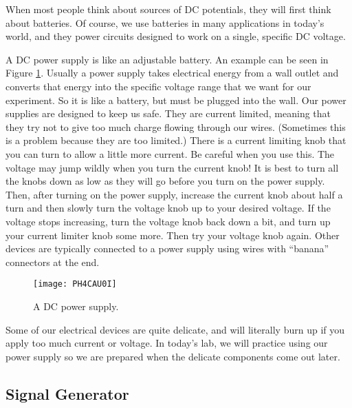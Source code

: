 When most people think about sources of DC potentials, they will first 
think about batteries. Of course, we use batteries in many applications in
today's world, and they power circuits designed to work on a single, specific
DC voltage. 

A DC power supply is like an adjustable battery.
An example can be seen in Figure \ref{fig:dc_power_supply}.
Usually a power supply takes
electrical energy from a wall outlet and converts that energy into the
specific voltage range that we want for our experiment. So it is like a
battery, but must be plugged into the wall. Our power supplies are designed
to keep us safe. They are current limited, meaning that they try not to give
too much charge flowing through our wires. (Sometimes this is a problem
because they are too limited.) There is a current limiting knob that you can
turn to allow a little more current. Be careful when you use this. The
voltage may jump wildly when you turn the current knob! It is best to turn
all the knobs down as low as they will go before you turn on the power
supply. Then, after turning on the power supply, increase the current knob
about half a turn and then slowly turn the voltage knob up to your desired
voltage. If the voltage stops increasing, turn the voltage knob back down a
bit, and turn up your current limiter knob some more. Then try your voltage
knob again. Other devices are typically connected to a power supply using
wires with ``banana'' connectors at the end.
\begin{figure}[htbp!]
\centering
\texttt{[image: PH4CAU0I]}
\caption[A DC power supply]{A DC power supply.}
\label{fig:dc_power_supply}
\end{figure}

Some of our electrical devices are quite delicate, and will literally burn
up if you apply too much current or voltage. In today's lab, we will
practice using our power supply so we are prepared when the delicate
components come out later.

\subsection{Signal Generator}

